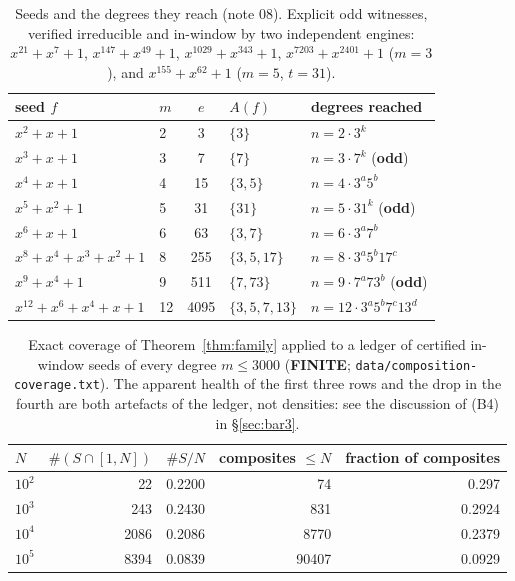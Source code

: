 \documentclass[10pt]{article}
\theoremstyle{plain}
\theoremstyle{definition}
\newcommand{\finite}{\textcolor{finite}{\textsf{\textbf{\footnotesize FINITE}}}}
\begin{document}
\begin{table}[t]
\centering\small
\begin{tabular}{llcll}
\hline
seed $f$ & $m$ & $e$ & $A(f)$ & degrees reached\\
\hline
$x^2+x+1$ & 2 & 3 & $\{3\}$ & $n=2\cdot3^k$\\
$x^3+x+1$ & 3 & 7 & $\{7\}$ & $n=3\cdot7^k$ \quad(\textbf{odd})\\
$x^4+x+1$ & 4 & 15 & $\{3,5\}$ & $n=4\cdot3^a5^b$\\
$x^5+x^2+1$ & 5 & 31 & $\{31\}$ & $n=5\cdot31^k$ \quad(\textbf{odd})\\
$x^6+x+1$ & 6 & 63 & $\{3,7\}$ & $n=6\cdot3^a7^b$\\
$x^8+x^4+x^3+x^2+1$ & 8 & 255 & $\{3,5,17\}$ & $n=8\cdot3^a5^b17^c$\\
$x^9+x^4+1$ & 9 & 511 & $\{7,73\}$ & $n=9\cdot7^a73^b$ \quad(\textbf{odd})\\
$x^{12}+x^6+x^4+x+1$ & 12 & 4095 & $\{3,5,7,13\}$ & $n=12\cdot3^a5^b7^c13^d$\\
\hline
\end{tabular}
\caption{Seeds and the degrees they reach (note 08). Explicit odd witnesses,
verified irreducible and in-window by two independent engines:
$x^{21}+x^7+1$, $x^{147}+x^{49}+1$, $x^{1029}+x^{343}+1$,
$x^{7203}+x^{2401}+1$ ($m=3$), and $x^{155}+x^{62}+1$ ($m=5$, $t=31$).}
\label{tab:seeds}
\end{table}

\begin{table}[t]
\centering\small
\begin{tabular}{lrrrr}
\hline
$N$ & $\#(S\cap[1,N])$ & $\#S/N$ & composites $\le N$ & fraction of composites\\
\hline
$10^2$ & 22 & 0.2200 & 74 & 0.297\\
$10^3$ & 243 & 0.2430 & 831 & 0.2924\\
$10^4$ & 2086 & 0.2086 & 8770 & 0.2379\\
$10^5$ & 8394 & 0.0839 & 90407 & 0.0929\\
\hline
\end{tabular}
\caption{Exact coverage of Theorem~\ref{thm:family} applied to a ledger of
certified in-window seeds of every degree $m\le3000$ (\finite;
\texttt{data/composition-coverage.txt}). The apparent health of the first three
rows and the drop in the fourth are both artefacts of the ledger, not
densities: see the discussion of (B4) in \S\ref{sec:bar3}.}
\label{tab:coverage}
\end{table}
\end{document}
